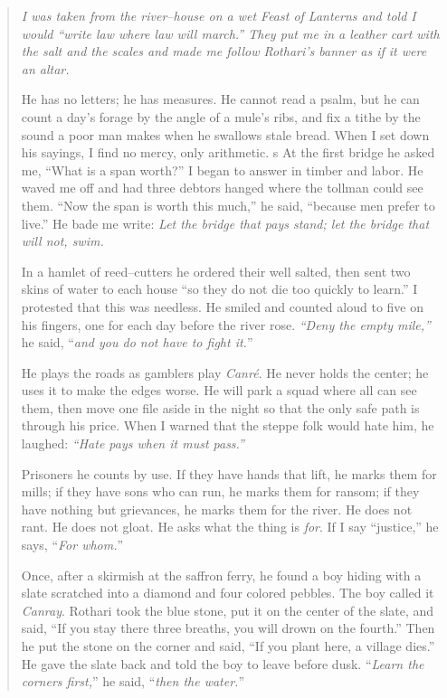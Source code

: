 \documentclass[11pt]{article}
\begin{document}
\begin{quote}\small\itshape
\noindent
I was taken from the river–house on a wet Feast of Lanterns and told I would “write law where law will march.” They put me in a leather cart with the salt and the scales and made me follow Rothari’s banner as if it were an altar.

He has no letters; he has measures. He cannot read a psalm, but he can count a day’s forage by the angle of a mule’s ribs, and fix a tithe by the sound a poor man makes when he swallows stale bread. When I set down his sayings, I find no mercy, only arithmetic.
s
At the first bridge he asked me, “What is a span worth?” I began to answer in timber and labor. He waved me off and had three debtors hanged where the tollman could see them. “Now the span is worth this much,” he said, “because men prefer to live.” He bade me write: \emph{Let the bridge that pays stand; let the bridge that will not, swim.}

In a hamlet of reed–cutters he ordered their well salted, then sent two skins of water to each house “so they do not die too quickly to learn.” I protested that this was needless. He smiled and counted aloud to five on his fingers, one for each day before the river rose. \emph{“Deny the empty mile,”} he said, “\emph{and you do not have to fight it.}”

He plays the roads as gamblers play \emph{Canré}. He never holds the center; he uses it to make the edges worse. He will park a squad where all can see them, then move one file aside in the night so that the only safe path is through his price. When I warned that the steppe folk would hate him, he laughed: \emph{“Hate pays when it must pass.”}

Prisoners he counts by use. If they have hands that lift, he marks them for mills; if they have sons who can run, he marks them for ransom; if they have nothing but grievances, he marks them for the river. He does not rant. He does not gloat. He asks what the thing is \emph{for}. If I say “justice,” he says, “\emph{For whom.}”

Once, after a skirmish at the saffron ferry, he found a boy hiding with a slate scratched into a diamond and four colored pebbles. The boy called it \emph{Canray}. Rothari took the blue stone, put it on the center of the slate, and said, “If you stay there three breaths, you will drown on the fourth.” Then he put the stone on the corner and said, “If you plant here, a village dies.” He gave the slate back and told the boy to leave before dusk. “\emph{Learn the corners first,}” he said, “\emph{then the water.}”


\end{quote}
\end{document}
